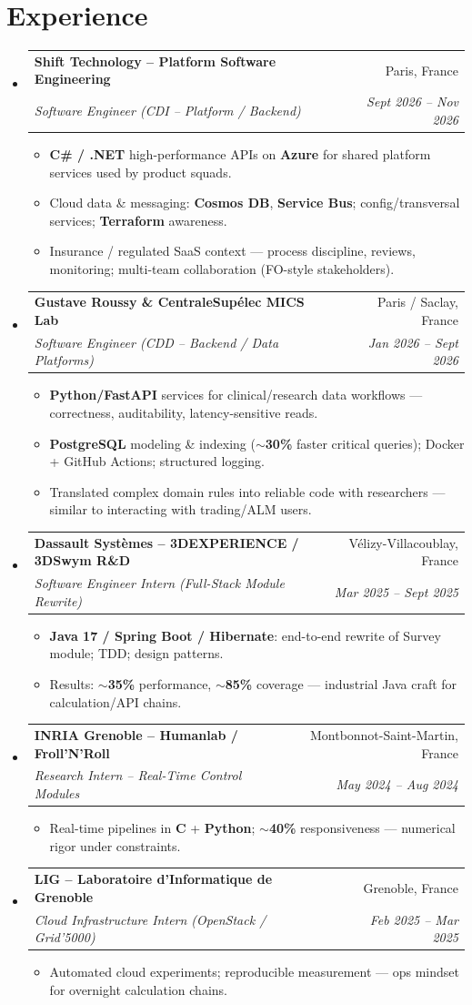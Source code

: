 \documentclass[letterpaper,10.5pt]{article}
\makeatletter
\newcommand{\resumeItem}[1]{\item\small{#1 \vspace{-1.5pt}}}
\newcommand{\resumeSubheading}[4]{\vspace{-1pt}\item\begin{tabular*}{0.97\textwidth}[t]{l@{\extracolsep{\fill}}r}\textbf{#1} & #2 \\\textit{\small#3} & \textit{\small #4} \\\end{tabular*}\vspace{-5pt}}
\newcommand{\resumeSubHeadingListStart}{\begin{itemize}[leftmargin=0.15in, label={}]}
\newcommand{\resumeSubHeadingListEnd}{\end{itemize}}
\newcommand{\resumeItemListStart}{\begin{itemize}[leftmargin=0.18in]}
\newcommand{\resumeItemListEnd}{\end{itemize}\vspace{-3pt}}
\makeatother
\begin{document}
\section{Experience}
\resumeSubHeadingListStart
  \resumeSubheading
    {Shift Technology -- Platform Software Engineering}{Paris, France}
    {Software Engineer (CDI -- Platform / Backend)}{Sept 2026 -- Nov 2026}
    \resumeItemListStart
      \resumeItem{\textbf{C\# / .NET} high-performance APIs on \textbf{Azure} for shared platform services used by product squads.}
      \resumeItem{Cloud data \& messaging: \textbf{Cosmos DB}, \textbf{Service Bus}; config/transversal services; \textbf{Terraform} awareness.}
      \resumeItem{Insurance / regulated SaaS context --- process discipline, reviews, monitoring; multi-team collaboration (FO-style stakeholders).}
    \resumeItemListEnd
  \resumeSubheading
    {Gustave Roussy \& CentraleSup\'elec MICS Lab}{Paris / Saclay, France}
    {Software Engineer (CDD -- Backend / Data Platforms)}{Jan 2026 -- Sept 2026}
    \resumeItemListStart
      \resumeItem{\textbf{Python/FastAPI} services for clinical/research data workflows --- correctness, auditability, latency-sensitive reads.}
      \resumeItem{\textbf{PostgreSQL} modeling \& indexing (\textbf{$\sim$30\%} faster critical queries); Docker + GitHub Actions; structured logging.}
      \resumeItem{Translated complex domain rules into reliable code with researchers --- similar to interacting with trading/ALM users.}
    \resumeItemListEnd
  \resumeSubheading
    {Dassault Syst\`emes -- 3DEXPERIENCE / 3DSwym R\&D}{V\'elizy-Villacoublay, France}
    {Software Engineer Intern (Full-Stack Module Rewrite)}{Mar 2025 -- Sept 2025}
    \resumeItemListStart
      \resumeItem{\textbf{Java 17 / Spring Boot / Hibernate}: end-to-end rewrite of Survey module; TDD; design patterns.}
      \resumeItem{Results: \textbf{$\sim$35\%} performance, \textbf{$\sim$85\%} coverage --- industrial Java craft for calculation/API chains.}
    \resumeItemListEnd
  \resumeSubheading
    {INRIA Grenoble -- Humanlab / Froll'N'Roll}{Montbonnot-Saint-Martin, France}
    {Research Intern -- Real-Time Control Modules}{May 2024 -- Aug 2024}
    \resumeItemListStart
      \resumeItem{Real-time pipelines in \textbf{C} + \textbf{Python}; \textbf{$\sim$40\%} responsiveness --- numerical rigor under constraints.}
    \resumeItemListEnd
  \resumeSubheading
    {LIG -- Laboratoire d'Informatique de Grenoble}{Grenoble, France}
    {Cloud Infrastructure Intern (OpenStack / Grid'5000)}{Feb 2025 -- Mar 2025}
    \resumeItemListStart
      \resumeItem{Automated cloud experiments; reproducible measurement --- ops mindset for overnight calculation chains.}
    \resumeItemListEnd
\resumeSubHeadingListEnd
\end{document}
